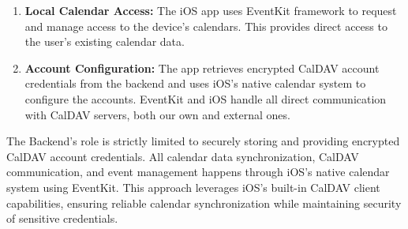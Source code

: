 \begin{enumerate}
    \item \textbf{Local Calendar Access:} The iOS app uses EventKit framework to request and manage access to the device's calendars. This provides direct access to the user's existing calendar data.

    \item \textbf{Account Configuration:} The app retrieves encrypted CalDAV account credentials from the backend and uses iOS's native calendar system to configure the accounts. EventKit and iOS handle all direct communication with CalDAV servers, both our own and external ones.
\end{enumerate}

The Backend's role is strictly limited to securely storing and providing encrypted CalDAV account credentials. All calendar data synchronization, CalDAV communication, and event management happens through iOS's native calendar system using EventKit. This approach leverages iOS's built-in CalDAV client capabilities, ensuring reliable calendar synchronization while maintaining security of sensitive credentials.